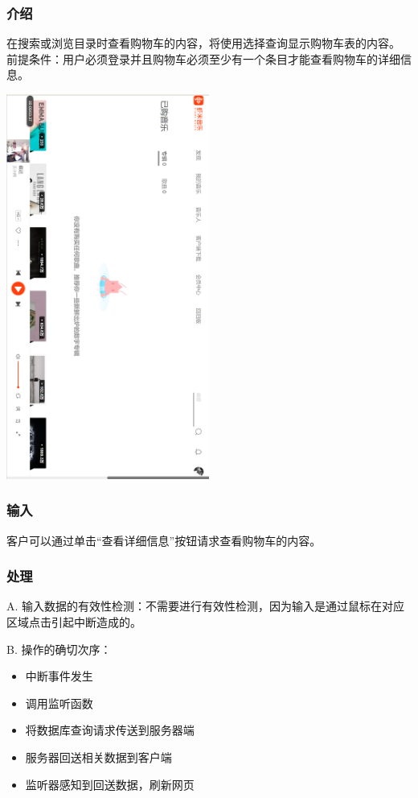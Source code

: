    \subsubsection{介绍}
   在搜索或浏览目录时查看购物车的内容，将使用选择查询显示购物车表的内容。
   前提条件：用户必须登录并且购物车必须至少有一个条目才能查看购物车的详细信息。
   \begin{center}
	\begin{sideways} 
   \includegraphics[width=0.5\textwidth]{./figures/capture13.png} 
	\end{sideways}
\end{center}
   \subsubsection{输入}
   
   客户可以通过单击“查看详细信息”按钮请求查看购物车的内容。


   \subsubsection{处理}
   

   
   A. 输入数据的有效性检测：不需要进行有效性检测，因为输入是通过鼠标在对应区域点击引起中断造成的。
   
   B. 操作的确切次序：
   \begin{adjustwidth}{2cm}{1cm}\qquad
	   \begin{itemize}
		   \item 中断事件发生
		   \item 调用监听函数
		   \item 将数据库查询请求传送到服务器端
		   \item 服务器回送相关数据到客户端
		   \item 监听器感知到回送数据，刷新网页
	   \end{itemize}		
   \end{adjustwidth}
	
